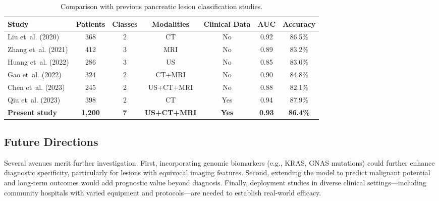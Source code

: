 \documentclass[a4paper, fleqn]{cas-dc}
\begin{document}
    \begin{table}[htbp]
        \centering
        \caption{Comparison with previous pancreatic lesion classification
        studies.}
        \label{tab:comparison}
        \begin{tabular*}{\tblwidth}{@{} lcccccc @{}}
            \toprule \textbf{Study}    & \textbf{Patients} & \textbf{Classes} & \textbf{Modalities} & \textbf{Clinical Data} & \textbf{AUC}  & \textbf{Accuracy} \\
            \midrule Liu et~al. (2020) & 368               & 2                & CT                  & No                     & 0.92          & 86.5\%            \\
            Zhang et~al. (2021)        & 412               & 3                & MRI                 & No                     & 0.89          & 83.2\%            \\
            Huang et~al. (2022)        & 286               & 3                & US                  & No                     & 0.85          & 83.0\%            \\
            Gao et~al. (2022)          & 324               & 2                & CT+MRI              & No                     & 0.90          & 84.8\%            \\
            Chen et~al. (2023)         & 245               & 2                & US+CT+MRI           & No                     & 0.88          & 82.1\%            \\
            Qiu et~al. (2023)          & 398               & 2                & CT                  & Yes                    & 0.94          & 87.9\%            \\
            \textbf{Present study}     & \textbf{1,200}    & \textbf{7}       & \textbf{US+CT+MRI}  & \textbf{Yes}           & \textbf{0.93} & \textbf{86.4\%}   \\
            \bottomrule
        \end{tabular*}
    \end{table}

    \subsection{Future Directions}
    Several avenues merit further investigation. First, incorporating genomic
    biomarkers (e.g., KRAS, GNAS mutations) could further enhance diagnostic specificity,
    particularly for lesions with equivocal imaging features. Second, extending
    the model to predict malignant potential and long‐term outcomes would add
    prognostic value beyond diagnosis. Finally, deployment studies in diverse
    clinical settings—including community hospitals with varied equipment and
    protocols—are needed to establish real‐world efficacy.
\end{document}
